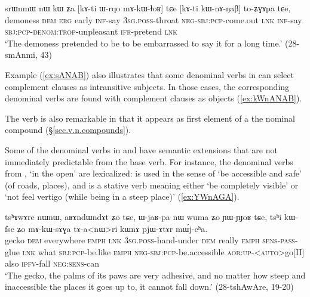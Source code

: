 \begin{exe}
\ex \label{ex:kWnANAB}
 \gll  srɯnmɯ nɯ kɯ ʑa [kɤ-ti ɯ-rqo mɤ-kɯ-ɬoʁ] tɕe [kɤ-ti kɯ-nɤ-ŋaβ] to-ʑɣɤpa tɕe, \\
demoness \textsc{dem} \textsc{erg} early \textsc{inf}-say \textsc{3sg}.\textsc{poss}-throat \textsc{neg}-\textsc{sbj}:\textsc{pcp}-come.out \textsc{lnk} \textsc{inf}-say \textsc{sbj}:\textsc{pcp}-\textsc{denom}:\textsc{trop}-unpleasant \textsc{ifr}-pretend \textsc{lnk} \\
\glt `The demoness pretended to be to be embarrassed to say it for a long time.' (28-smAnmi, 43)
\end{exe}

Example (\ref{ex:sANAB})  also illustrates that some denominal verbs in  can select complement clauses as intransitive subjects. In those cases, the corresponding  denominal verbs are found with complement clauses as objects (\ref{ex:kWnANAB}).

The verb  is also remarkable in that it appears as first element of a the nominal compound   (§\ref{sec.v.n.compounds}). 
 
Some of the denominal verbs in  and  have semantic extensions that are not immediately predictable from the base verb. For instance, the denominal verbs from , `in the open'  are lexicalized:  is used in the sense of `be accessible and safe' (of roads, places), and  is a stative verb meaning either `be completely visible' or `not feel vertigo (while being in a steep place)' (\ref{ex:YWnAGA}).

\begin{exe}
\ex \label{ex:mAkWsAGa}
 \gll  tsʰɤwɤre nɯnɯ, aʁɤndɯndɤt ʑo tɕe, ɯ-jaʁ-pa nɯ wuma ʑo ɲɯ-ɲɟoʁ tɕe, tsʰi kɯ-fse ʑo mɤ-kɯ-sɤɣa tɤ-a<nɯ>ri kɯnɤ pjɯ-ɤtɤr mɯ́j-cʰa. \\
 gecko \textsc{dem} everywhere \textsc{emph} \textsc{lnk} \textsc{3sg}.\textsc{poss}-hand-under \textsc{dem} really \textsc{emph} \textsc{sens}-\textsc{pass}-glue \textsc{lnk} what \textsc{sbj}:\textsc{pcp}-be.like \textsc{emph} \textsc{neg}-\textsc{sbj}:\textsc{pcp}-be.accessible \textsc{aor}:\textsc{up}-<\textsc{auto}>go[II] also \textsc{ipfv}-fall \textsc{neg}:\textsc{sens}-can \\
\glt `The gecko, the palms of its paws are very adhesive, and no matter how steep and inaccessible the places it goes up to, it cannot fall down.' (28-tshAwAre, 19-20)
 \end{exe}
 
